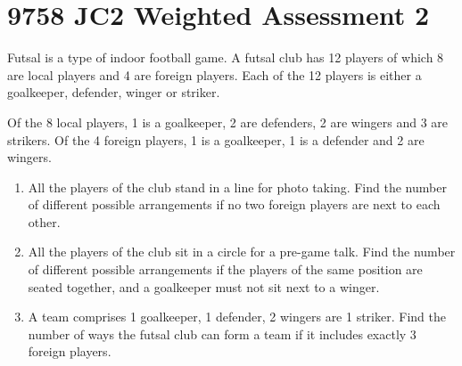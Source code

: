 \section{9758 JC2 Weighted Assessment 2}

\begin{problem}
    Futsal is a type of indoor football game. A futsal club has 12 players of which 8 are local players and 4 are foreign players. Each of the 12 players is either a goalkeeper, defender, winger or striker.

    Of the 8 local players, 1 is a goalkeeper, 2 are defenders, 2 are wingers and 3 are strikers. Of the 4 foreign players, 1 is a goalkeeper, 1 is a defender and 2 are wingers.

    \begin{enumerate}
        \item All the players of the club stand in a line for photo taking. Find the number of different possible arrangements if no two foreign players are next to each other.
        \item All the players of the club sit in a circle for a pre-game talk. Find the number of different possible arrangements if the players of the same position are seated together, and a goalkeeper must not sit next to a winger.
        \item A team comprises 1 goalkeeper, 1 defender, 2 wingers are 1 striker. Find the number of ways the futsal club can form a team if it includes exactly 3 foreign players.
    \end{enumerate}
\end{problem}
